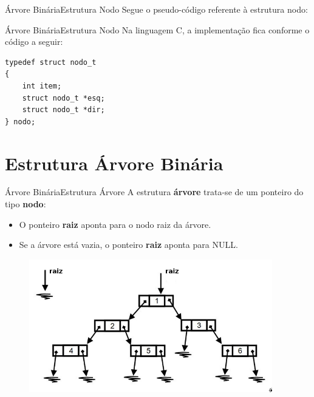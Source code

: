 \documentclass[aspectratio=169]{beamer}
\begin{document}
\begin{frame}[fragile]{Árvore Binária}{Estrutura Nodo}
Segue o pseudo-código referente à estrutura nodo:
\begin{algorithm}[H]
\caption{Nodo} 
\label{Nodo}
\end{algorithm} 
\end{frame}


\begin{frame}[fragile]{Árvore Binária}{Estrutura Nodo}
Na linguagem C, a implementação fica conforme o código a seguir:
\begin{lstlisting}[style=CStyle]
typedef struct nodo_t
{
    int item;
    struct nodo_t *esq;
    struct nodo_t *dir;
} nodo;
\end{lstlisting}  
\end{frame}

\section{Estrutura Árvore Binária}

\begin{frame}{Árvore Binária}{Estrutura Árvore}
A estrutura {\bf árvore} trata-se de um ponteiro do tipo {\bf nodo}:
\begin{itemize}
 \item O ponteiro {\bf raiz} aponta para o nodo raiz da árvore.
 \item Se a árvore está vazia, o ponteiro {\bf raiz} aponta para NULL.
\end{itemize}
\begin{figure}[!h]
  \centering
  \includegraphics[width=300pt]{imagens/estrutura_arvore.png}
  \label{fig_estrutura_arvore}
\end{figure}
\end{frame}
\end{document}
